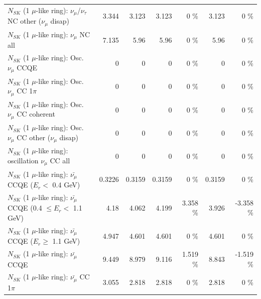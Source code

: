 \begin{table}
\begin{tabular}{| l | r | r | r  r | r  r |}
   $N_{SK}$ (1 $\mu$-like ring): $\nu_\mu$/$\nu_\tau$ NC other ($\nu_\mu$ disap) &           3.344 &           3.123 &           3.123 &        0 \%  &           3.123 &        0 \%  \\ 
                                $N_{SK}$ (1 $\mu$-like ring): $\nu_{\mu}$ NC all &           7.135 &            5.96 &            5.96 &        0 \%  &            5.96 &        0 \%  \\ 
\hline
\hline
                               $N_{SK}$ (1 $\mu$-like ring): Osc. $\nu_\mu$ CCQE &               0 &               0 &               0 &        0 \%  &               0 &        0 \%  \\ 
                          $N_{SK}$ (1 $\mu$-like ring): Osc. $\nu_\mu$ CC 1$\pi$ &               0 &               0 &               0 &        0 \%  &               0 &        0 \%  \\ 
                        $N_{SK}$ (1 $\mu$-like ring): Osc. $\nu_\mu$ CC coherent &               0 &               0 &               0 &        0 \%  &               0 &        0 \%  \\ 
         $N_{SK}$ (1 $\mu$-like ring): Osc. $\nu_\mu$ CC other ($\nu_\mu$ disap) &               0 &               0 &               0 &        0 \%  &               0 &        0 \%  \\ 
                      $N_{SK}$ (1 $\mu$-like ring): oscillation $\nu_\mu$ CC all &               0 &               0 &               0 &        0 \%  &               0 &        0 \%  \\ 
\hline
\hline
          $N_{SK}$ (1 $\mu$-like ring): $\bar{\nu_\mu}$ CCQE ($E_{r} <$ 0.4 GeV) &          0.3226 &          0.3159 &          0.3159 &        0 \%  &          0.3159 &        0 \%  \\ 
 $N_{SK}$ (1 $\mu$-like ring): $\bar{\nu_\mu}$ CCQE (0.4 $\leq E_{r} <$ 1.1 GeV) &            4.18 &           4.062 &           4.199 &    3.358 \%  &           3.926 &   -3.358 \%  \\ 
       $N_{SK}$ (1 $\mu$-like ring): $\bar{\nu_\mu}$ CCQE ($E_{r} \geq$ 1.1 GeV) &           4.947 &           4.601 &           4.601 &        0 \%  &           4.601 &        0 \%  \\ 
\hline
                              $N_{SK}$ (1 $\mu$-like ring): $\bar{\nu_\mu}$ CCQE &           9.449 &           8.979 &           9.116 &    1.519 \%  &           8.843 &   -1.519 \%  \\ 
                         $N_{SK}$ (1 $\mu$-like ring): $\bar{\nu_\mu}$ CC 1$\pi$ &           3.055 &           2.818 &           2.818 &        0 \%  &           2.818 &        0 \%  \\ 

\end{tabular}
\end{table}
